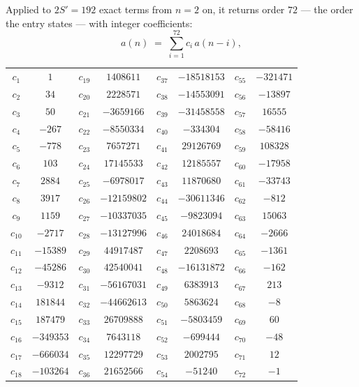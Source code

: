 \documentclass[11pt,a4paper]{article}
\theoremstyle{plain}
\theoremstyle{definition}
\begin{document}
Applied to $2S'=192$ exact terms from $n=2$ on, it returns order $72$ --- the
order the entry states --- with integer coefficients:
\[
a(n)\;=\;\sum_{i=1}^{72}c_i\,a(n-i),
\]
\begin{center}\small
\begin{tabular}{cccccccc}
$c_{1}$ & $1$ & $c_{19}$ & $1408611$ & $c_{37}$ & $-18518153$ & $c_{55}$ & $-321471$ \\
$c_{2}$ & $34$ & $c_{20}$ & $2228571$ & $c_{38}$ & $-14553091$ & $c_{56}$ & $-13897$ \\
$c_{3}$ & $50$ & $c_{21}$ & $-3659166$ & $c_{39}$ & $-31458558$ & $c_{57}$ & $16555$ \\
$c_{4}$ & $-267$ & $c_{22}$ & $-8550334$ & $c_{40}$ & $-334304$ & $c_{58}$ & $-58416$ \\
$c_{5}$ & $-778$ & $c_{23}$ & $7657271$ & $c_{41}$ & $29126769$ & $c_{59}$ & $108328$ \\
$c_{6}$ & $103$ & $c_{24}$ & $17145533$ & $c_{42}$ & $12185557$ & $c_{60}$ & $-17958$ \\
$c_{7}$ & $2884$ & $c_{25}$ & $-6978017$ & $c_{43}$ & $11870680$ & $c_{61}$ & $-33743$ \\
$c_{8}$ & $3917$ & $c_{26}$ & $-12159802$ & $c_{44}$ & $-30611346$ & $c_{62}$ & $-812$ \\
$c_{9}$ & $1159$ & $c_{27}$ & $-10337035$ & $c_{45}$ & $-9823094$ & $c_{63}$ & $15063$ \\
$c_{10}$ & $-2717$ & $c_{28}$ & $-13127996$ & $c_{46}$ & $24018684$ & $c_{64}$ & $-2666$ \\
$c_{11}$ & $-15389$ & $c_{29}$ & $44917487$ & $c_{47}$ & $2208693$ & $c_{65}$ & $-1361$ \\
$c_{12}$ & $-45286$ & $c_{30}$ & $42540041$ & $c_{48}$ & $-16131872$ & $c_{66}$ & $-162$ \\
$c_{13}$ & $-9312$ & $c_{31}$ & $-56167031$ & $c_{49}$ & $6383913$ & $c_{67}$ & $213$ \\
$c_{14}$ & $181844$ & $c_{32}$ & $-44662613$ & $c_{50}$ & $5863624$ & $c_{68}$ & $-8$ \\
$c_{15}$ & $187479$ & $c_{33}$ & $26709888$ & $c_{51}$ & $-5803459$ & $c_{69}$ & $60$ \\
$c_{16}$ & $-349353$ & $c_{34}$ & $7643118$ & $c_{52}$ & $-699444$ & $c_{70}$ & $-48$ \\
$c_{17}$ & $-666034$ & $c_{35}$ & $12297729$ & $c_{53}$ & $2002795$ & $c_{71}$ & $12$ \\
$c_{18}$ & $-103264$ & $c_{36}$ & $21652566$ & $c_{54}$ & $-51240$ & $c_{72}$ & $-1$ \\
\end{tabular}
\end{center}
\end{document}
